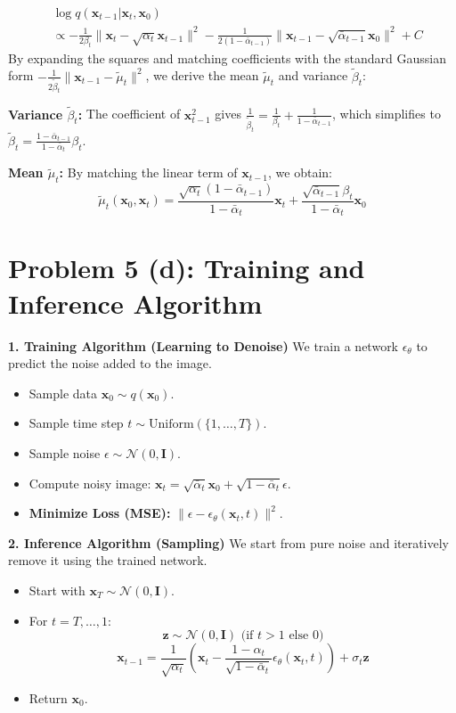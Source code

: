 \documentclass[12pt]{article}
\begin{document}
\[
\begin{aligned}
    & \log q(\mathbf{x}_{t-1} | \mathbf{x}_t, \mathbf{x}_0) \\
    &\propto -\frac{1}{2\beta_t} \|\mathbf{x}_t - \sqrt{\alpha_t}\mathbf{x}_{t-1}\|^2 - \frac{1}{2(1-\bar{\alpha}_{t-1})} \|\mathbf{x}_{t-1} - \sqrt{\bar{\alpha}_{t-1}}\mathbf{x}_0\|^2 + C
\end{aligned}
\]
By expanding the squares and matching coefficients with the standard Gaussian form $-\frac{1}{2\tilde{\beta}_t}\|\mathbf{x}_{t-1} - \tilde{\mu}_t\|^2$, we derive the mean $\tilde{\mu}_t$ and variance $\tilde{\beta}_t$:

\textbf{Variance $\tilde{\beta}_t$:}
The coefficient of $\mathbf{x}_{t-1}^2$ gives $\frac{1}{\tilde{\beta}_t} = \frac{1}{\beta_t} + \frac{1}{1-\bar{\alpha}_{t-1}}$, which simplifies to $\tilde{\beta}_t = \frac{1-\bar{\alpha}_{t-1}}{1-\bar{\alpha}_t} \beta_t$.

\textbf{Mean $\tilde{\mu}_t$:}
By matching the linear term of $\mathbf{x}_{t-1}$, we obtain:
\[
    \tilde{\mu}_t(\mathbf{x}_0, \mathbf{x}_t) = \frac{\sqrt{\alpha_t}(1-\bar{\alpha}_{t-1})}{1-\bar{\alpha}_t}\mathbf{x}_t + \frac{\sqrt{\bar{\alpha}_{t-1}}\beta_t}{1-\bar{\alpha}_t}\mathbf{x}_0
\]

\section*{Problem 5 (d): Training and Inference Algorithm}

\textbf{1. Training Algorithm (Learning to Denoise)}
We train a network $\epsilon_\theta$ to predict the noise added to the image.
\begin{itemize}
    \item Sample data $\mathbf{x}_0 \sim q(\mathbf{x}_0)$.
    \item Sample time step $t \sim \text{Uniform}(\{1, \dots, T\})$.
    \item Sample noise $\epsilon \sim \mathcal{N}(0, \mathbf{I})$.
    \item Compute noisy image: $\mathbf{x}_t = \sqrt{\bar{\alpha}_t}\mathbf{x}_0 + \sqrt{1-\bar{\alpha}_t}\epsilon$.
    \item \textbf{Minimize Loss (MSE):} $\| \epsilon - \epsilon_\theta(\mathbf{x}_t, t) \|^2$.
\end{itemize}

\textbf{2. Inference Algorithm (Sampling)}
We start from pure noise and iteratively remove it using the trained network.
\begin{itemize}
    \item Start with $\mathbf{x}_T \sim \mathcal{N}(0, \mathbf{I})$.
    \item For $t = T, \dots, 1$:
    \[
        \mathbf{z} \sim \mathcal{N}(0, \mathbf{I}) \text{ (if } t > 1 \text{ else } 0)
    \]
    \[
        \mathbf{x}_{t-1} = \frac{1}{\sqrt{\alpha_t}} \left( \mathbf{x}_t - \frac{1-\alpha_t}{\sqrt{1-\bar{\alpha}_t}} \epsilon_\theta(\mathbf{x}_t, t) \right) + \sigma_t \mathbf{z}
    \]
    \item Return $\mathbf{x}_0$.
\end{itemize}
\end{document}
